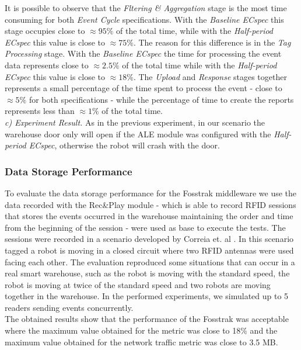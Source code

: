 It is possible to observe that the \textit{Fltering \& Aggregation} stage is the most time consuming
for both \textit{Event Cycle} specifications. With the \textit{Baseline ECspec} this stage occupies
close to $\approx95\%$ of the total time, while with the \textit{Half-period ECspec} this value is
close to $\approx75\%$. The reason for this difference is in the \textit{Tag Processing} stage.
With the \textit{Baseline ECspec} the time for processing the event data represents close to $\approx2.5\%$
of the total time while with the \textit{Half-period ECspec} this value is close to $\approx18\%$.
The \textit{Upload} and \textit{Response} stages together represents a small percentage of
the time spent to process the event - close to $\approx5\%$ for both specifications - while the percentage
of time to create the reports represents less than $\approx1\%$ of the total time.\\

\textit{c) Experiment Result.}
As in the previous experiment, in our scenario the warehouse door only will open if the \gls{ALE}
module was configured with the \textit{Half-period ECspec}, otherwise the robot will crash with
the door.\\

\subsubsection{Data Storage Performance}
\label{subs:data_storage_performance}
To evaluate the data storage performance for the Fosstrak middleware we use the data recorded with
the Rec\&Play module - which is able to record \gls{RFID} sessions that stores the events occurred
in the warehouse maintaining the order and time from the beginning of the session - were used as
base to execute the tests. The sessions were recorded in a scenario developed by Correia et. al \cite{Correia:Thesis:2014}.
In this scenario tagged a robot is moving in a closed circuit where two RFID antennas were used facing
each other. The evaluation reproduced some situations that can occur in a real smart warehouse,
such as the robot is moving with the standard speed, the robot is moving at twice of the standard
speed and two robots are moving together in the warehouse. In the performed experiments, we
simulated up to 5 readers sending events concurrently.\\

The obtained results show that the performance of the Fosstrak was acceptable where the maximum
value obtained for the  metric was close to 18$\%$ and the maximum
value obtained for the network traffic metric was close to 3.5 \gls{MB}.

